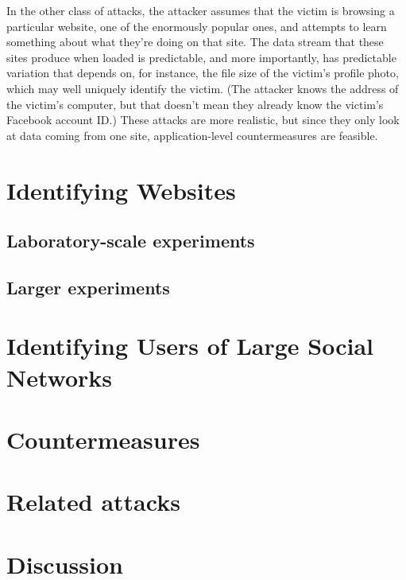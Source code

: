 \documentclass{zarticle}
\begin{document}
In the other class of attacks, the attacker assumes that the victim is
browsing a particular website, one of the enormously popular ones, and
attempts to learn something about what they're doing on that site.
The data stream that these sites produce when loaded is predictable,
and more importantly, has predictable variation that depends on, for
instance, the file size of the victim's profile photo, which may well
uniquely identify the victim.  (The attacker knows the address of the
victim's computer, but that doesn't mean they already know the
victim's Facebook account ID.)  These attacks are more realistic, but
since they only look at data coming from one site, application-level
countermeasures are feasible.

\section{Identifying Websites}

\subsection{Laboratory-scale experiments}

\subsection{Larger experiments}

\section{Identifying Users of Large Social Networks}

\section{Countermeasures}

\section{Related attacks}

\section{Discussion}

\printbibliography
\end{document}
